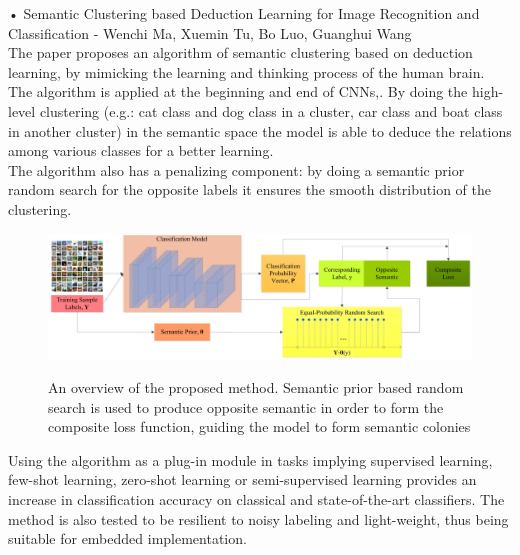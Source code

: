\documentclass[11pt, a4paper, oneside, pdftex]{research_paper}
\begin{document}
\hspace{20mm}•\hspace{3mm}	Semantic Clustering based Deduction Learning for Image Recognition and Classification - Wenchi Ma, Xuemin Tu, Bo Luo, Guanghui Wang \\
\null \hspace{30mm}	The paper proposes an algorithm of semantic clustering based on deduction learning, by mimicking the learning and thinking process of the human brain. The algorithm is applied at the beginning and end of CNNs,. By doing the high-level clustering (e.g.: cat class and dog class in a cluster, car class  and boat class in another cluster) in the semantic space the model is able to deduce the relations among various classes for a better learning. \\
\null \hspace{30mm}	The algorithm also has a penalizing component: by doing a semantic prior random search for the opposite labels it ensures the smooth distribution of the clustering. \\
\goodbreak
\begin{figure}[!h]
    \centering
    \includegraphics[width=0.9\linewidth]{figures/image_2}
    \caption{ An overview of the proposed method. Semantic prior based random search is used
to produce opposite semantic in order to form the composite loss function, guiding the model to
form semantic colonies}
    \label{fig:figure2}\cite{2}
\end{figure}  
\null \hspace{30mm}	Using the algorithm as a plug-in module in tasks implying supervised learning, few-shot learning, zero-shot learning or semi-supervised learning provides an increase in classification accuracy on classical and state-of-the-art classifiers. The method is also tested to be resilient to noisy labeling and light-weight, thus being suitable for embedded implementation. \\
\end{document}
